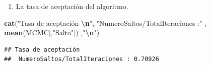 \documentclass[
]{article}
\newenvironment{Shaded}{\begin{snugshade}}{\end{snugshade}}
\newcommand{\FunctionTok}[1]{\textcolor[rgb]{0.13,0.29,0.53}{\textbf{#1}}}
\newcommand{\NormalTok}[1]{#1}
\newcommand{\SpecialCharTok}[1]{\textcolor[rgb]{0.81,0.36,0.00}{\textbf{#1}}}
\newcommand{\StringTok}[1]{\textcolor[rgb]{0.31,0.60,0.02}{#1}}
\providecommand{\tightlist}{%
  \setlength{\itemsep}{0pt}\setlength{\parskip}{0pt}}
\begin{document}
\begin{enumerate}
\def\labelenumi{\alph{enumi}.}
\setcounter{enumi}{6}
\tightlist
\item
  La tasa de aceptación del algoritmo.
\end{enumerate}

\begin{Shaded}
\begin{Highlighting}[]
\FunctionTok{cat}\NormalTok{(}\StringTok{"Tasa de aceptación }\SpecialCharTok{\textbackslash{}n}\StringTok{"}\NormalTok{,}
    \StringTok{"NumeroSaltos/TotalIteraciones :"}\NormalTok{ , }\FunctionTok{mean}\NormalTok{(MCMC[,}\StringTok{"Salto"}\NormalTok{]) ,}\StringTok{"}\SpecialCharTok{\textbackslash{}n}\StringTok{"}\NormalTok{)}
\end{Highlighting}
\end{Shaded}

\begin{verbatim}
## Tasa de aceptación 
##  NumeroSaltos/TotalIteraciones : 0.70926
\end{verbatim}
\end{document}
